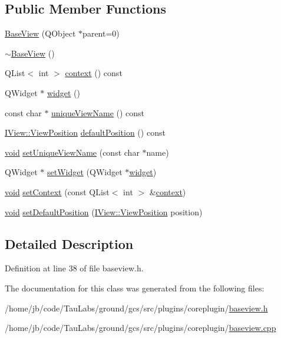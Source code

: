 \subsection*{\-Public \-Member \-Functions}
\begin{DoxyCompactItemize}
\item 
\hyperlink{group___core_plugin_ga5d80afbd92e0f0a0a53764a87f8f8c1b}{\-Base\-View} (\-Q\-Object $\ast$parent=0)
\item 
\hyperlink{group___core_plugin_ga0b87986502d132344f08be851cdb15d2}{$\sim$\-Base\-View} ()
\item 
\-Q\-List$<$ int $>$ \hyperlink{group___core_plugin_ga237172a9f51bf4dd4a74c431d4cee707}{context} () const 
\item 
\-Q\-Widget $\ast$ \hyperlink{group___core_plugin_ga73210f3a32961fb3c1df6267292cc551}{widget} ()
\item 
const char $\ast$ \hyperlink{group___core_plugin_gab66e855b09d536c08790f53cdd26a853}{unique\-View\-Name} () const 
\item 
\hyperlink{group___core_plugin_ga2423997830c6fd1ceb278f80dcbfc010}{\-I\-View\-::\-View\-Position} \hyperlink{group___core_plugin_gaaf97d82844aaac02f2116f78c9ec7898}{default\-Position} () const 
\item 
\hyperlink{group___u_a_v_objects_plugin_ga444cf2ff3f0ecbe028adce838d373f5c}{void} \hyperlink{group___core_plugin_gad9c37de2ece6e6152bdb4ceadf0e9618}{set\-Unique\-View\-Name} (const char $\ast$name)
\item 
\-Q\-Widget $\ast$ \hyperlink{group___core_plugin_ga010e75c3fb8e47962937ebeec0d133f7}{set\-Widget} (\-Q\-Widget $\ast$\hyperlink{group___core_plugin_ga73210f3a32961fb3c1df6267292cc551}{widget})
\item 
\hyperlink{group___u_a_v_objects_plugin_ga444cf2ff3f0ecbe028adce838d373f5c}{void} \hyperlink{group___core_plugin_ga0d50cefedb506910309b1e83938ae3a3}{set\-Context} (const \-Q\-List$<$ int $>$ \&\hyperlink{group___core_plugin_ga237172a9f51bf4dd4a74c431d4cee707}{context})
\item 
\hyperlink{group___u_a_v_objects_plugin_ga444cf2ff3f0ecbe028adce838d373f5c}{void} \hyperlink{group___core_plugin_ga4cd8b9c4d6cf47fa0ece91c8783a3c17}{set\-Default\-Position} (\hyperlink{group___core_plugin_ga2423997830c6fd1ceb278f80dcbfc010}{\-I\-View\-::\-View\-Position} position)
\end{DoxyCompactItemize}


\subsection{\-Detailed \-Description}


\-Definition at line 38 of file baseview.\-h.



\-The documentation for this class was generated from the following files\-:\begin{DoxyCompactItemize}
\item 
/home/jb/code/\-Tau\-Labs/ground/gcs/src/plugins/coreplugin/\hyperlink{baseview_8h}{baseview.\-h}\item 
/home/jb/code/\-Tau\-Labs/ground/gcs/src/plugins/coreplugin/\hyperlink{baseview_8cpp}{baseview.\-cpp}\end{DoxyCompactItemize}
